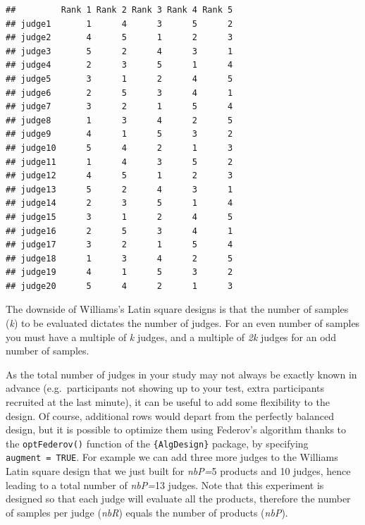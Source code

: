 \documentclass[
]{krantz}
\begin{document}
\begin{verbatim}
##         Rank 1 Rank 2 Rank 3 Rank 4 Rank 5
## judge1       1      4      3      5      2
## judge2       4      5      1      2      3
## judge3       5      2      4      3      1
## judge4       2      3      5      1      4
## judge5       3      1      2      4      5
## judge6       2      5      3      4      1
## judge7       3      2      1      5      4
## judge8       1      3      4      2      5
## judge9       4      1      5      3      2
## judge10      5      4      2      1      3
## judge11      1      4      3      5      2
## judge12      4      5      1      2      3
## judge13      5      2      4      3      1
## judge14      2      3      5      1      4
## judge15      3      1      2      4      5
## judge16      2      5      3      4      1
## judge17      3      2      1      5      4
## judge18      1      3      4      2      5
## judge19      4      1      5      3      2
## judge20      5      4      2      1      3
\end{verbatim}

The downside of Williams's Latin square designs is that the number of samples (\emph{k}) to be evaluated dictates the number of judges. For an even number of samples you must have a multiple of \emph{k} judges, and a multiple of \emph{2k} judges for an odd number of samples.

As the total number of judges in your study may not always be exactly known in advance (e.g.~participants not showing up to your test, extra participants recruited at the last minute), it can be useful to add some flexibility to the design. Of course, additional rows would depart from the perfectly balanced design, but it is possible to optimize them using Federov's algorithm thanks to the \texttt{optFederov()} function of the \texttt{\{AlgDesign\}} package, by specifying \texttt{augment\ =\ TRUE}. For example we can add three more judges to the Williams Latin square design that we just built for \emph{nbP=}5 products and 10 judges, hence leading to a total number of \emph{nbP=}13 judges. Note that this experiment is designed so that each judge will evaluate all the products, therefore the number of samples per judge (\emph{nbR}) equals the number of products (\emph{nbP}).
\end{document}
